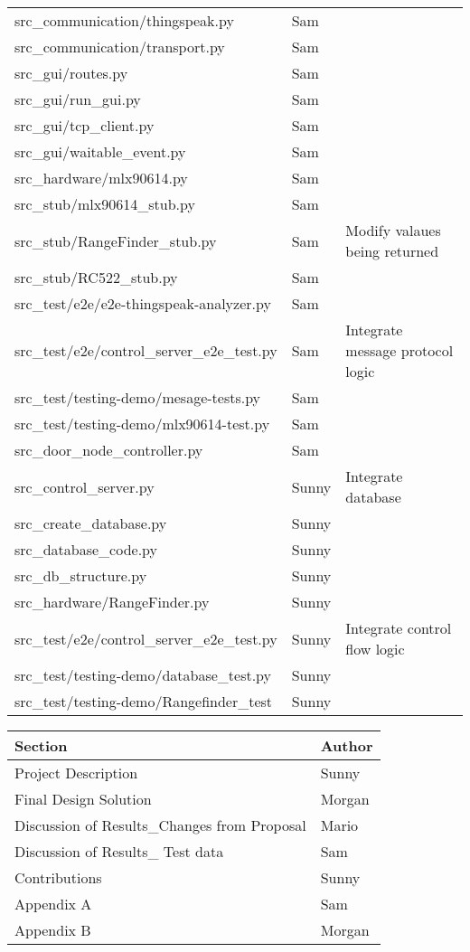 \begin{center}
\begin{tabular}{lll}
src\_communication/thingspeak.py & Sam&\\
src\_communication/transport.py & Sam&\\
src\_gui/routes.py & Sam&\\
src\_gui/run\_gui.py & Sam&\\
src\_gui/tcp\_client.py & Sam&\\
src\_gui/waitable\_event.py & Sam&\\
src\_hardware/mlx90614.py & Sam&\\
src\_stub/mlx90614\_stub.py & Sam&\\
src\_stub/RangeFinder\_stub.py & Sam & Modify valaues being returned\\
src\_stub/RC522\_stub.py & Sam&\\
src\_test/e2e/e2e-thingspeak-analyzer.py & Sam&\\
src\_test/e2e/control\_server\_e2e\_test.py & Sam& Integrate message protocol logic\\
src\_test/testing-demo/mesage-tests.py & Sam&\\
src\_test/testing-demo/mlx90614-test.py & Sam&\\
src\_door\_node\_controller.py & Sam&\\
src\_control\_server.py & Sunny & Integrate database \\
src\_create\_database.py & Sunny&\\
src\_database\_code.py & Sunny&\\
src\_db\_structure.py & Sunny&\\
src\_hardware/RangeFinder.py & Sunny&\\
src\_test/e2e/control\_server\_e2e\_test.py & Sunny& Integrate control flow logic\\
src\_test/testing-demo/database\_test.py & Sunny&\\
src\_test/testing-demo/Rangefinder\_test & Sunny&\\
\end{tabular}
\end{center}

\begin{center}
\begin{tabular}{ll}
Section & Author\\
\hline
Project Description &  Sunny\\
Final Design Solution &   Morgan\\
Discussion of Results\_Changes from Proposal &   Mario\\
Discussion of Results\_ Test data &   Sam\\
Contributions &   Sunny\\
Appendix A &   Sam\\
Appendix B &   Morgan\\
\end{tabular}
\end{center}
